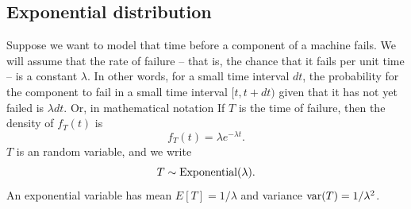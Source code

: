 \subsection{Exponential distribution}
 Suppose we want to model that time before a component of a machine fails. We will assume that the rate of failure -- that is, the chance that it fails per unit time -- is a constant $\lambda$. In other words, for a small time interval $dt$, the probability for the component to fail in a small time interval $[t,t+dt)$ given that it has not yet failed is $\lambda dt$. Or, in mathematical notation 
 If $T$ is the time of failure, then the density of $f_T(t)$ is 
\begin{equation*}
f_T(t) = \lambda e^{-\lambda t}.
\end{equation*}
$T$ is an  random variable, and we write
\begin{equation*}
T \sim {\rm Exponential}(\lambda).
\end{equation*}
An exponential variable has mean $E[T] = 1/\lambda$ and variance ${\rm var}(T) = 1/\lambda^2$. 




